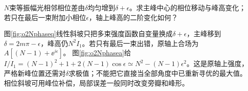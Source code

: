 \begin{exercise}\label{ex:o2Nphasechange}
$N$束等振幅光相邻相位差由$\delta$均匀增到$\delta+\epsilon$。求主峰中心的相位移动与峰高变化；若只在最后一束附加小相位$\epsilon$，轴上峰高的二阶变化如何？
\end{exercise}
\begin{solution}
图\ref{fig:o2Nphaseq}线性斜坡只把多束强度函数自变量换成$\delta+\epsilon$，主峰移到$\delta=2m\pi-\epsilon$，峰高仍$N^2I_1$。若只有最后一束出错，原轴上合场为$A[(N-1)+\ee^{i\epsilon}]$。
图\ref{fig:o2Nphasea}给$I/I_1=(N-1)^2+1+2(N-1)\cos\epsilon\simeq N^2-(N-1)\epsilon^2$。这是原轴上强度，严格新峰位置还需对$\delta$求极值；不能把它直接当全部角度中已重新寻优的最大值。相位斜坡可用峰位补偿，局部误差一般同时改变旁瓣和峰形。
\end{solution}
